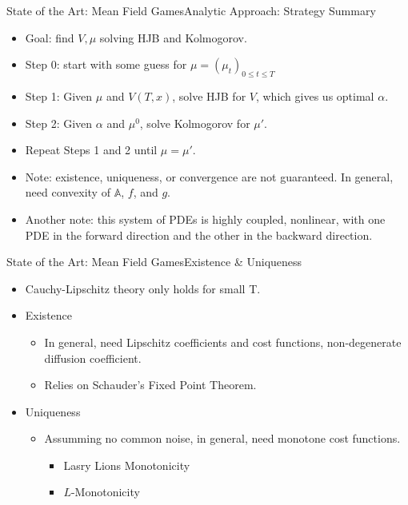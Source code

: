 \documentclass{beamer}
\begin{document}
\begin{frame}{State of the Art: Mean Field Games}{Analytic Approach: Strategy Summary}
	\begin{itemize}
				\item {
					Goal: find $V, \mu$ solving HJB and Kolmogorov.
				}
				\item {
					Step 0: start with some guess for $\mu=(\mu_t)_{0 \leq t \leq T}$
				}
				\item {
					Step 1: Given $\mu$ and $V(T,x)$, solve HJB for $V$, which gives us optimal $\alpha$.
				}
				\item {
					Step 2: Given $\alpha$ and $\mu^0$, solve Kolmogorov for $\mu '$.
				}
				\item {
					Repeat Steps 1 and 2 until $\mu = \mu '$.
				}
				\pause
				\item {
					Note: existence, uniqueness, or convergence are not guaranteed. In general, need convexity of $\mathbb{A}$, $f$, and $g$.
				}
				\pause
				\item {
					Another note: this system of PDEs is highly coupled, nonlinear, with one PDE in the forward direction and the other in the backward direction.
				}
	\end{itemize}
\end{frame}

\begin{frame}{State of the Art: Mean Field Games}{Existence \& Uniqueness}
	\begin{itemize}
		\item {
			Cauchy-Lipschitz theory only holds for small T.
		}
		\item {
			Existence
			\begin{itemize}
				\item In general, need Lipschitz coefficients and cost functions, non-degenerate diffusion coefficient.
				\item Relies on Schauder's Fixed Point Theorem.
			\end{itemize}
		}
		\item {
			Uniqueness
			\begin{itemize}
				\item Assumming no common noise, in general, need monotone cost functions.
				\begin{itemize}
				\item Lasry Lions Monotonicity
				\item $L$-Monotonicity
				\end{itemize}
			\end{itemize}
		}
	\end{itemize}
\end{frame}
\end{document}
